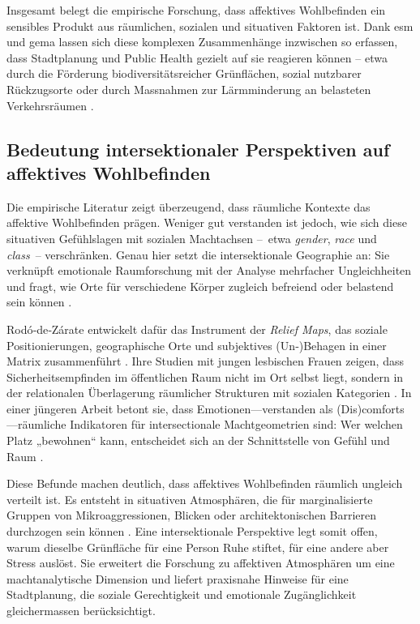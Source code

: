 Insgesamt belegt die empirische Forschung, dass affektives Wohlbefinden ein sensibles Produkt aus räumlichen, sozialen und situativen Faktoren ist. Dank \gls{esm} und \gls{gema} lassen sich diese komplexen Zusammenhänge inzwischen so erfassen, dass Stadtplanung und Public Health gezielt auf sie reagieren können – etwa durch die Förderung biodiversitätsreicher Grünflächen, sozial nutzbarer Rückzugsorte oder durch Massnahmen zur Lärmminderung an belasteten Verkehrsräumen \parencite{cookeMeasuringWellBeingReview2016}.

\subsection{Bedeutung intersektionaler Perspektiven auf affektives Wohlbefinden}

Die empirische Literatur zeigt überzeugend, dass räumliche Kontexte das affektive Wohlbefinden prägen. Weniger gut verstanden ist jedoch, wie sich diese situativen Gefühlslagen mit sozialen Machtachsen – etwa \textit{gender}, \textit{race} und \textit{class} – verschränken. Genau hier setzt die intersektionale Geographie an: Sie verknüpft emotionale Raumforschung mit der Analyse mehrfacher Ungleichheiten und fragt, wie Orte für verschiedene Körper zugleich befreiend oder belastend sein können \parencite{rodo-de-zarateIntersectionalityFeministGeographies2018}. 

Rodó‑de‑Zárate entwickelt dafür das Instrument der \textit{Relief Maps}, das soziale Positionierungen, geographische Orte und subjektives (Un‑)Behagen in einer Matrix zusammenführt \parencite{rodo-de-zarateDevelopingGeographiesIntersectionality2014}. Ihre Studien mit jungen lesbischen Frauen zeigen, dass Sicherheitsempfinden im öffentlichen Raum nicht im Ort selbst liegt, sondern in der relationalen Überlagerung räumlicher Strukturen mit sozialen Kategorien \textcite{rodo-de-zarateYoungLesbiansNegotiating2015}. In einer jüngeren Arbeit betont sie, dass Emotionen—verstanden als (Dis)comforts—räumliche Indikatoren für intersectionale Machtgeometrien sind: Wer welchen Platz „bewohnen“ kann, entscheidet sich an der Schnittstelle von Gefühl und Raum \parencite{rodo-de-zarateIntersectionalitySpatialityEmotions2023}. 

Diese Befunde machen deutlich, dass affektives Wohlbefinden räumlich ungleich verteilt ist. Es entsteht in situativen Atmosphären, die für marginalisierte Gruppen von Mikroaggressionen, Blicken oder architektonischen Barrieren durchzogen sein können \parencite{websterCenteringSocialtechnicalRelations2021}. Eine intersektionale Perspektive legt somit offen, warum dieselbe Grünfläche für eine Person Ruhe stiftet, für eine andere aber Stress auslöst. Sie erweitert die Forschung zu affektiven Atmosphären um eine machtanalytische Dimension und liefert praxisnahe Hinweise für eine Stadtplanung, die soziale Gerechtigkeit und emotionale Zugänglichkeit gleichermassen berücksichtigt.


